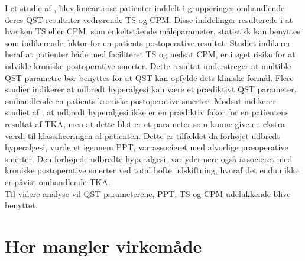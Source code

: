 I et studie af , blev knæartrose patienter inddelt i grupperinger omhandlende deres QST-resultater vedrørende TS og CPM. Disse inddelinger resulterede i at hverken TS eller CPM, som enkeltstående måleparameter, statistisk kan benyttes som indikerende faktor for en patients postoperative resultat. Studiet indikerer heraf at patienter både med faciliteret TS og nedsat CPM, er i øget risiko for at udvikle kroniske postoperative smerter. Dette resultat understreger at multible QST parametre bør benyttes for at QST kan opfylde dets kliniske formål. \citep{Petersen2016} Flere studier indikerer at udbredt hyperalgesi kan være et prædiktivt QST parameter, omhandlende en patients kroniske postoperative smerter. \citep{Petersen2016} \citep{Wylde2013} Modsat indikerer studiet af , at udbredt hyperalgesi ikke er en prædiktiv fakor for en patientens resultat af TKA, men at dette blot er et parameter som kunne give en ekstra værdi til klassificeringen af patienten. Dette er tilfældet da forhøjet udbredt hyperalgesi, vurderet igennem PPT, var associeret med alvorlige præoperative smerter. Den forhøjede udbredte hyperalgesi, var ydermere også associeret med kroniske postoperative smerter ved total hofte udskiftning, hvoraf det endnu ikke er påvist omhandlende TKA. \citep{Wylde2015} \\
Til videre analyse vil QST parameterene, PPT, TS og CPM udelukkende blive benyttet.


\section{Her mangler virkemåde}


